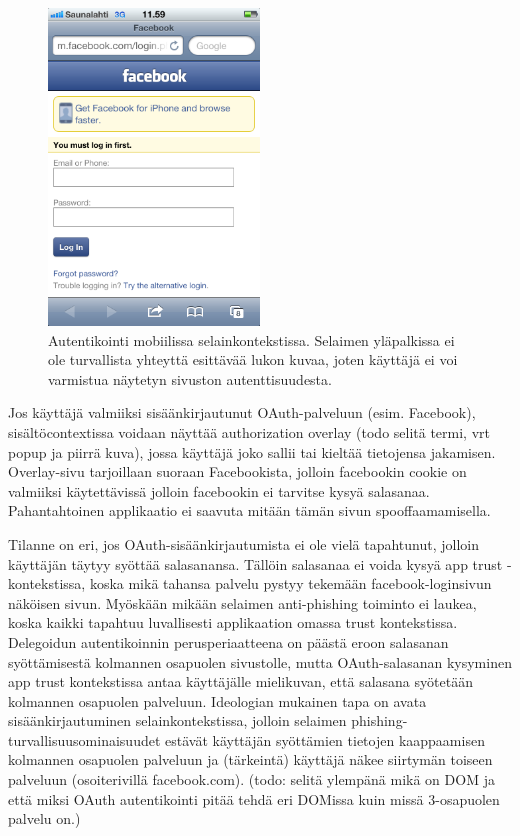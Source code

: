 \documentclass[finnish,gradu]{tktltiki}
\begin{document}
  \begin{figure}
    \centering
    \includegraphics[width=0.5\textwidth]{images/trust_context_mobile_unknown_secure.png}
    \caption{Autentikointi mobiilissa selainkontekstissa. Selaimen yläpalkissa ei ole turvallista yhteyttä esittävää lukon kuvaa, joten käyttäjä ei voi varmistua näytetyn sivuston autenttisuudesta.}
    \label{fig:trust_context_mobile_unknown_secure}
  \end{figure}


  Jos käyttäjä valmiiksi sisäänkirjautunut OAuth-palveluun (esim. Facebook), sisältöcontextissa voidaan näyttää authorization overlay (todo selitä termi, vrt popup ja piirrä kuva), jossa käyttäjä joko sallii tai kieltää tietojensa jakamisen. Overlay-sivu tarjoillaan suoraan Facebookista, jolloin facebookin cookie on valmiiksi käytettävissä jolloin facebookin ei tarvitse kysyä salasanaa. Pahantahtoinen applikaatio ei saavuta mitään tämän sivun spooffaamamisella.

  Tilanne on eri, jos OAuth-sisäänkirjautumista ei ole vielä tapahtunut, jolloin käyttäjän täytyy syöttää salasanansa. Tällöin salasanaa ei voida kysyä app trust -kontekstissa, koska mikä tahansa palvelu pystyy tekemään facebook-loginsivun näköisen sivun. Myöskään mikään selaimen anti-phishing toiminto ei laukea, koska kaikki tapahtuu luvallisesti applikaation omassa trust kontekstissa. Delegoidun autentikoinnin perusperiaatteena on päästä eroon salasanan syöttämisestä kolmannen osapuolen sivustolle, mutta OAuth-salasanan kysyminen app trust kontekstissa antaa käyttäjälle mielikuvan, että salasana syötetään kolmannen osapuolen palveluun. Ideologian mukainen tapa on avata sisäänkirjautuminen selainkontekstissa, jolloin selaimen phishing-turvallisuusominaisuudet estävät käyttäjän syöttämien tietojen kaappaamisen kolmannen osapuolen palveluun ja (tärkeintä) käyttäjä näkee siirtymän toiseen palveluun (osoiterivillä facebook.com). (todo: selitä ylempänä mikä on DOM ja että miksi OAuth autentikointi pitää tehdä eri DOMissa kuin missä 3-osapuolen palvelu on.)
\end{document}
